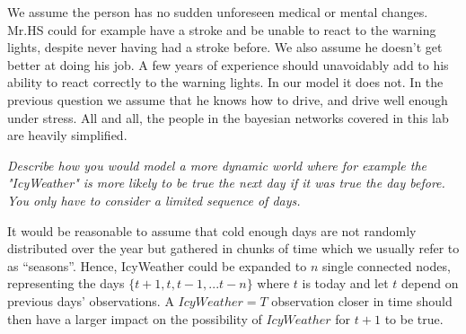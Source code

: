   We assume the person has no sudden unforeseen medical or mental changes. Mr.HS could for example have a stroke and be unable to react to the warning lights, despite never having had a stroke before. We also assume he doesn't get better at doing his job. A few years of experience should unavoidably add to his ability to react correctly to the warning lights. In our model it does not. In the previous question we assume that he knows how to drive, and drive well enough under stress. All and all, the people in the bayesian networks covered in this lab are heavily simplified.

\vspace{.5cm}
\begin{framed}\em Describe how you would model a more dynamic world where for example the "IcyWeather" is more likely to be true the next day if it was true the day before. You only have to consider a limited sequence of days.\em\label{42}\end{framed}
\vspace{.5cm}

It would be reasonable to assume that cold enough days are not randomly distributed over the year but gathered in chunks of time which we usually refer to as ``seasons''. Hence, IcyWeather could be expanded to $n$ single connected nodes, representing the days $\{t+1, t, t-1, ... t-n\}$ where $t$ is today and let $t$ depend on previous days' observations. A $IcyWeather=T$ observation closer in time should then have a larger impact on the possibility of $IcyWeather$ for $t+1$ to be true.
